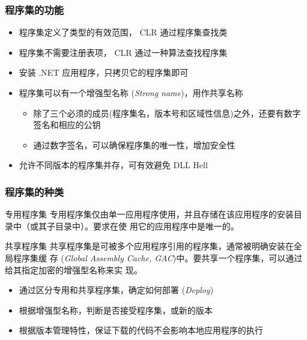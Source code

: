 \begin{frame}
\frametitle{程序集的功能}
\begin{itemize}
  \setlength{\itemsep}{10pt plus 1pt}
\item 程序集定义了类型的有效范围， CLR 通过程序集查找类
\item 程序集不需要注册表项， CLR 通过一种算法查找程序集
\item 安装 .NET 应用程序，只拷贝它的程序集即可\pause
\item 程序集可以有一个{增强型名称} (\textit{Strong name})，用作共享名称
  \begin{itemize}
  \item 除了三个必须的成员(程序集名，版本号和区域性信息)之外，还要有数字签名和相应的公钥
  \item 通过数字签名，可以确保程序集的唯一性，增加安全性
  \end{itemize}

\item 允许不同版本的程序集并存，可有效避免 DLL Hell
\end{itemize}
\end{frame}

\begin{frame}
\frametitle{程序集的种类}

\begin{block}{专用程序集}
  \CJKindent \small 专用程序集仅由单一应用程序使用，并且存储在该应用程序的安装目录中（或其子目录中）。要求在使
  用它的应用程序中是唯一的。
\end{block}
\pause
\begin{block}{共享程序集}
  \CJKindent \small 共享程序集是可被多个应用程序引用的程序集，通常被明确安装在全局程序集缓
  存 (\textit{Global Assembly Cache, GAC})中。要共享一个程序集，可以通过给其指定加密的增强型名称来实
  现。
\end{block}
\pause
\begin{itemize}
\item 通过区分专用和共享程序集，确定如何{部署} (\textit{Deploy})
\item 根据增强型名称，判断是否接受程序集，或新的版本
\item 根据版本管理特性，保证下载的代码不会影响本地应用程序的执行
\end{itemize}

\end{frame}

